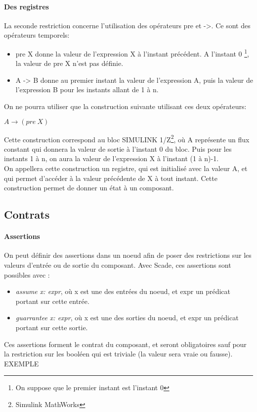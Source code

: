 \paragraph{Des registres}
La seconde restriction concerne l'utilisation des opérateurs pre et
->. Ce sont des opérateurs temporels:
\begin{itemize}
\item pre X donne la valeur de l'expression X à l'instant précédent. A
l'instant 0 \footnote{On suppose que le premier instant est l'instant
0}, la valeur de pre X n'est pas définie. 
\item A -> B donne au premier instant la valeur de l'expression A, 
puis la valeur de l'expression B pour les instants allant de 1 à n. 
\end{itemize}
On ne pourra utiliser que la construction suivante utilisant ces deux
opérateurs: 
\begin{center}
$A\rightarrow(pre~X)$
\end{center}
Cette construction correspond au bloc SIMULINK 1/Z\footnote{Simulink MathWorks}, où A représente un
flux constant qui donnera la valeur de sortie à l'instant 0 du
bloc. Puis pour les instants 1 à n, on aura la valeur de l'expression
X à l'instant (1 à n)-1. \\
On appellera cette construction un registre, qui est initialisé avec la
valeur A, et qui permet d'accéder à la valeur précédente de X à tout
instant. Cette construction permet de donner un état à un composant.


\subsection{Contrats}

\paragraph{Assertions}
On peut définir des assertions dans un noeud afin de poser des
restrictions sur les valeurs d'entrée ou de sortie du composant. Avec
Scade, ces assertions sont possibles avec :
\begin{itemize}
\item \emph{assume x: expr}, où x est une des entrées du noeud, et
expr un prédicat portant sur cette entrée.
\item \emph{guarrantee x: expr}, où x est une des sorties du noeud, et
expr un prédicat portant sur cette sortie.
\end{itemize}
Ces assertions forment le contrat du composant, et seront
obligatoires sauf pour la restriction sur les booléen qui est triviale (la
valeur sera vraie ou fausse).\\

EXEMPLE
